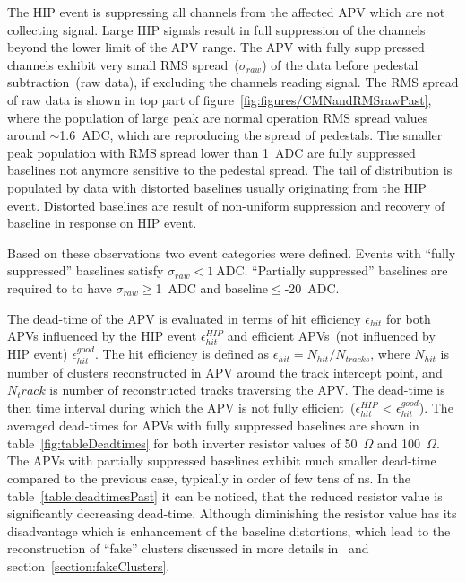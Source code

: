 The HIP event is suppressing all channels from the affected APV which are not collecting signal. Large HIP signals result in full suppression of the channels beyond the lower limit of the APV range. The APV with fully supp pressed channels exhibit very small RMS spread~($\sigma_{raw}$) of the data before pedestal subtraction~(raw data), if excluding the channels reading signal. The RMS spread of raw data is shown in top part of figure~\ref{fig:figures/CMNandRMSrawPast}, where the population of large peak are normal operation RMS spread values around $\sim$1.6~ADC, which are reproducing the spread of pedestals. The smaller peak population with RMS spread lower than 1~ADC are fully suppressed baselines not anymore sensitive to the pedestal spread. The tail of distribution is populated by data with distorted baselines usually originating from the HIP event. Distorted baselines are result of non-uniform suppression and recovery of baseline in response on HIP event.

Based on these observations two event categories were defined. Events with ``fully suppressed'' baselines satisfy $\sigma_{raw}< 1~\mathrm{ADC}$. ``Partially suppressed'' baselines are required to to have $\sigma_{raw}\geq$1~ADC and baseline$\leq$-20~ADC.


The dead-time of the APV is evaluated in terms of hit efficiency $\epsilon_{hit}$ for both APVs influenced by the HIP event $\epsilon_{hit}^{HIP}$ and efficient APVs~(not influenced by HIP event) $\epsilon_{hit}^{good}$. The hit efficiency is defined as $\epsilon_{hit} = N_{hit}/N_{tracks}$, where $N_{hit}$ is number of clusters reconstructed in APV around the track intercept point, and $N_track$ is number of reconstructed tracks traversing the APV. The dead-time is then time interval during which the APV is not fully efficient~($\epsilon_{hit}^{HIP}$ < $\epsilon_{hit}^{good}$). The averaged dead-times for APVs with fully suppressed baselines are shown in table~\ref{fig:tableDeadtimes} for both inverter resistor values of 50~$\Omega$ and 100~$\Omega$. The APVs with partially suppressed baselines exhibit much smaller dead-time compared to the previous case, typically in order of few tens of ns. In the table~\ref{table:deadtimesPast} it can be noticed, that the reduced resistor value is significantly decreasing dead-time. Although diminishing the resistor value has its disadvantage which is enhancement of the baseline distortions, which lead to the reconstruction of ``fake'' clusters discussed in more details in~\cite{Bainbridge:2004jc} and section~\ref{section:fakeClusters}.

